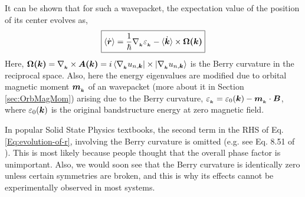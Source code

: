 \documentclass{report}
\renewcommand\vec[1]{\ensuremath\boldsymbol{#1}} %
\begin{document}
It can be shown \cite{ralph2020berry} that for such a wavepacket, the expectation value of the position of its center evolves as,
\begin{equation}\label{Eq:evolution-of-r}
	\boxed{\langle\dot{\vec{r}}\rangle = \frac{1}{\hbar} \nabla{_{_{\vec{k}}}} \varepsilon_{_{\vec{k}}} - \langle\dot{\vec{k}}\rangle \times \vec{\Omega(\vec{k})}}
\end{equation}
Here, $\vec{\Omega(\vec{k})} = \nabla_{_{\vec{k}}} \times \vec{A(\vec{k})} = i \bra{\nabla_{_{\vec{k}}} u_{n,\vec{k}}}\times \ket{\nabla_{_{\vec{k}}} u_{n,\vec{k}}}$ is the Berry curvature in the reciprocal space. Also, here the energy eigenvalues are modified due to orbital magnetic moment $\vec{m}_{_{\vec{k}}}$ of an wavepacket (more about it in Section \ref{sec:OrbMagMom}) arising due to the Berry curvature, $\varepsilon_{_{\vec{k}}} = \varepsilon_0(\vec{k}) - \vec{m}_{_{\vec{k}}} \cdot \vec{B}$, where $\varepsilon_0(\vec{k})$ is the original bandstructure energy at zero magnetic field.

In popular Solid State Physics textbooks, the second term in the RHS of Eq. \eqref{Eq:evolution-of-r}, involving the Berry curvature is omitted (e.g. see Eq. 8.51 of \cite{book:AshcroftMermin76}). This is most likely because people thought that the overall phase factor is unimportant. Also, we would soon see that the Berry curvature is identically zero unless certain symmetries are broken, and this is why its effects cannot be experimentally observed in most systems. 
\end{document}
